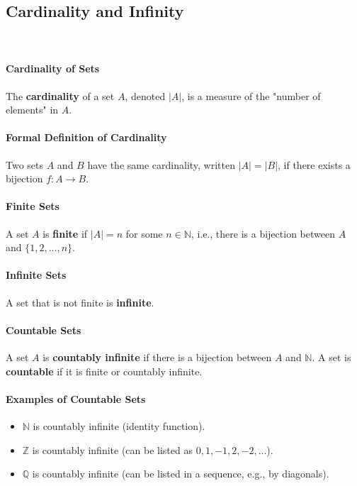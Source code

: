 \subsection*{Cardinality and Infinity}
\hrulefill\\

\paragraph*{Cardinality of Sets}
The \textbf{cardinality} of a set $A$, denoted $|A|$, is a measure of the "number of elements" in $A$.

\paragraph*{Formal Definition of Cardinality}
Two sets $A$ and $B$ have the same cardinality, written $|A| = |B|$, if there exists a bijection $f: A \to B$.

\paragraph*{Finite Sets}
A set $A$ is \textbf{finite} if $|A| = n$ for some $n \in \mathbb{N}$, i.e., there is a bijection between $A$ and $\{1,2,\ldots,n\}$.

\paragraph*{Infinite Sets}
A set that is not finite is \textbf{infinite}.

\paragraph*{Countable Sets}
A set $A$ is \textbf{countably infinite} if there is a bijection between $A$ and $\mathbb{N}$. A set is \textbf{countable} if it is finite or countably infinite.

\paragraph*{Examples of Countable Sets}
\begin{itemize}
    \item $\mathbb{N}$ is countably infinite (identity function).
    \item $\mathbb{Z}$ is countably infinite (can be listed as $0,1,-1,2,-2,\ldots$).
    \item $\mathbb{Q}$ is countably infinite (can be listed in a sequence, e.g., by diagonals).
\end{itemize}


